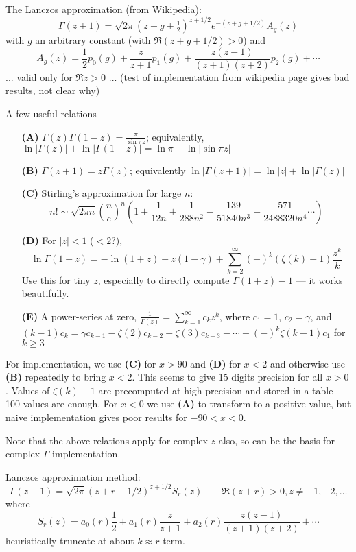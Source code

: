 \documentclass[10pt,dvipdfmx,letterpaper,twoside]{article}
\newenvironment{implementation}{\noindent\begin{framed}}{\end{framed}}
\let\Gam=\Gamma
\begin{document}
The Lanczos approximation (from Wikipedia):
\[ \Gam(z+1) = \sqrt{2\pi}(z+g+\tfrac12)^{z+1/2} e^{-(z+g+1/2)} A_g(z) \]
with $g$ an arbitrary constant (with $\Re(z+g+1/2)>0$) and
\[ A_g(z) = \frac12 p_0(g) + \frac{z}{z+1} p_1(g) + \frac{z(z-1)}{(z+1)(z+2)} p_2(g) + \cdots \]
... valid only for $\Re z>0$ ... (test of implementation from wikipedia page gives bad results, not clear why)

\begin{implementation}
A few useful relations
\begin{itemize}
\item[\bf(A)] $\Gam(z)\Gam(1-z) = \frac{\pi}{\sin\pi z}$; equivalently, $\ln|\Gam(z)| + \ln|\Gam(1-z)| = \ln\pi - \ln|\sin\pi z|$
\item[\bf(B)] $\Gam(z+1) = z\Gam(z)$; equivalently $\ln|\Gam(z+1)| = \ln|z| + \ln|\Gam(z)|$
\item[\bf(C)] Stirling's approximation for large $n$:
  \[n! \sim \sqrt{2\pi n}\left(\frac{n}{e}\right)^n\left(
      1 + \frac{1}{12 n} + \frac{1}{288 n^2} - \frac{139}{51840 n^3} - \frac{571}{2488320 n^4} \cdots\right)\]
\item[\bf(D)] For $|z|<1$ ($<2$?),
  \[ \ln\Gam(1+z) = -\ln(1+z) + z(1-\gamma) + \sum_{k=2}^\infty(-)^k(\zeta(k)-1)\frac{z^k}{k} \]
  Use this for tiny $z$, especially to directly compute $\Gam(1+z)-1$ --- it works beautifully.
\item[\bf(E)] A power-series at zero, $\frac{1}{\Gam(z)} = \sum_{k=1}^\infty c_k z^k$, where $c_1=1$, $c_2=\gamma$,
  and $(k-1)c_k = \gamma c_{k-1} - \zeta(2) c_{k-2} + \zeta(3) c_{k-3} - \cdots + (-)^k \zeta(k-1) c_1$ for $k\geq3$
\end{itemize}
For implementation, we use {\bf(C)} for $x>90$ and {\bf(D)} for $x<2$ and otherwise use {\bf(B)} repeatedly to bring $x<2$.  This seems to
give 15 digits precision for all $x>0$.  Values of $\zeta(k)-1$ are precomputed at high-precision and stored in a table --- 100 values are enough.
For $x<0$ we use {\bf(A)} to transform to a positive value, but naive implementation gives poor results for $-90<x<0$.

Note that the above relations apply for complex $z$ also, so can be the basis for complex $\Gam$ implementation.
\end{implementation}

Lanczos approximation method:
\[ \Gam(z+1) = \sqrt{2\pi} (z+r+1/2)^{z+1/2} S_r(z) \qquad \Re(z+r)>0, z\neq-1,-2,\dots \]
where
\[ S_r(z) = a_0(r)\frac{1}{2} + a_1(r)\frac{z}{z+1} + a_2(r)\frac{z(z-1)}{(z+1)(z+2)} + \cdots \]
heuristically truncate at about $k\approx r$ term.
\end{document}
